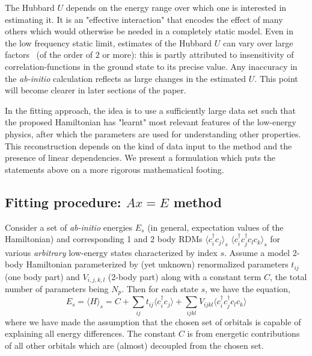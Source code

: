 \documentclass[aip,jcp,twocolumn,10pt]{revtex4-1}
\begin{document}
The Hubbard $U$ depends on the energy range 
over which one is interested in estimating it. It is an 
"effective interaction" that encodes the effect of many others 
which would otherwise be needed in a completely static model.
Even in the low frequency static limit, estimates 
of the Hubbard $U$ can vary over large factors~\cite{Fei_Lin} 
(of the order of $2$ or more): this is partly attributed to insensitivity 
of correlation-functions in the ground state to its precise value. 
Any inaccuracy in the \emph{ab-initio} calculation reflects as 
large changes in the estimated $U$. This point 
will become clearer in later sections of the paper.
 
In the fitting approach, the idea is to use a sufficiently 
large data set such that the proposed Hamiltonian has "learnt" most 
relevant features of the low-energy physics, after which the parameters 
are used for understanding other properties. 
This reconstruction depends on the kind of data input to the method 
and the presence of linear dependencies. 
We present a formulation which puts the statements above 
on a more rigorous mathematical footing.

\subsection{Fitting procedure: $Ax=E$ method}
\label{sec:AxE}
Consider a set of \emph{ab-initio} 
energies $E_s$ (in general, expectation values of the Hamiltonian) 
and corresponding 1 and 2 body RDMs $\langle c_i^{\dagger} c_j \rangle_s$ 
$\langle c_i^{\dagger}c_j^{\dagger} c_l c_k \rangle_s$ 
for various \emph{arbitrary} low-energy states characterized by index $s$. 
Assume a model 2-body Hamiltonian parameterized by (yet unknown) 
renormalized parameters $t_{ij}$ (one body part) 
and $V_{i,j,k,l}$ (2-body part) along with a constant term $C$, 
the total number of parameters being $N_p$. Then for each state $s$, 
we have the equation, 
\begin{equation}
	E_s = \langle H \rangle_s = C + \sum_{ij} t_{ij} \langle c_i^{\dagger} c_j \rangle + \sum_{ijkl} V_{ijkl} \langle c_i^{\dagger}c_j^{\dagger} c_l c_k \rangle  
\end{equation}
where we have made the assumption that the chosen set of orbitals 
is capable of explaining all energy differences. The constant $C$ is from energetic contributions 
of all other orbitals which are (almost) decoupled from the chosen set.  
 
\end{document}
